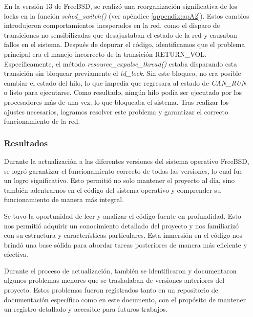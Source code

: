 En la versión 13 de FreeBSD, se realizó una reorganización significativa de los locks en la función \textit{sched\_switch()} (ver apéndice \ref{appendix:apA2}). Estos cambios introdujeron comportamientos inesperados en la red, como el disparo de transiciones no sensibilizadas que desajustaban el estado de la red y causaban fallos en el sistema. Después de depurar el código, identificamos que el problema principal era el manejo incorrecto de la transición RETURN\_VOL. Específicamente, el método \textit{resource\_expulse\_thread()} estaba disparando esta transición sin bloquear previamente el \textit{td\_lock}. Sin este bloqueo, no era posible cambiar el estado del hilo, lo que impedía que regresara al estado de \textit{CAN\_RUN} o listo para ejecutarse. Como resultado, ningún hilo podía ser ejecutado por los procesadores más de una vez, lo que bloqueaba el sistema. Tras realizar los ajustes necesarios, logramos resolver este problema y garantizar el correcto funcionamiento de la red.\par

\subsubsection{Resultados}

Durante la actualización a las diferentes versiones del sistema operativo FreeBSD, se logró garantizar el funcionamiento correcto de todas las versiones, lo cual fue un logro significativo. Esto permitió no solo mantener el proyecto al día, sino también adentrarnos en el código del sistema operativo y comprender su funcionamiento de manera más integral.\par

Se tuvo la oportunidad de leer y analizar el código fuente en profundidad. Esto nos permitió adquirir un conocimiento detallado del proyecto y nos familiarizó con su estructura y características particulares. Esta inmersión en el código nos brindó una base sólida para abordar tareas posteriores de manera más eficiente y efectiva.\par

Durante el proceso de actualización, también se identificaron y documentaron algunos problemas menores que se trasladaban de versiones anteriores del proyecto. Estos problemas fueron registrados tanto en un repositorio de documentación específico como en este documento, con el propósito de mantener un registro detallado y accesible para futuros trabajos.\par


